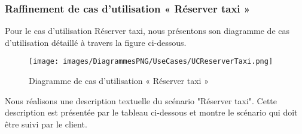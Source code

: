 {\subsubsection{Raffinement de cas d'utilisation « Réserver taxi »}
Pour le cas d'utilisation Réserver taxi, nous présentons son diagramme de cas d'utilisation détaillé à travers la figure ci-dessous.

\begin{figure}[H]
\centering
\texttt{[image: images/DiagrammesPNG/UseCases/UCReserverTaxi.png]}
\caption{Diagramme de cas d'utilisation « Réserver taxi »}
\end{figure}

Nous réalisons une description textuelle du scénario "Réserver taxi". Cette description est présentée par le tableau ci-dessous et montre le scénario qui doit être suivi par le client.\\

}
